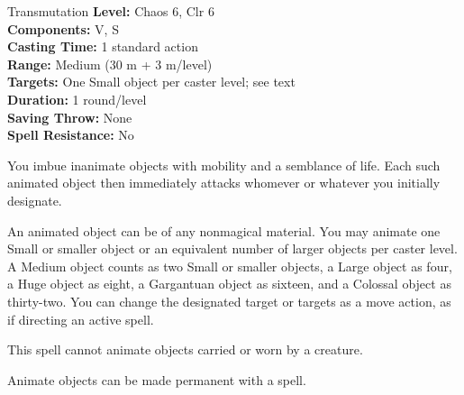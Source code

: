 {Transmutation}
{
	\textbf{Level:}
	Chaos 6, Clr 6\\
	\textbf{Components:}
	V, S\\
	\textbf{Casting Time:}
	1 standard action\\
	\textbf{Range:}
	Medium (30 m + 3 m/level)\\
	\textbf{Targets:}
	One Small object per caster level; see text\\
	\textbf{Duration:}
	1 round/level\\
	\textbf{Saving Throw:}
	None\\
	\textbf{Spell Resistance:}
	No\\
}
{
	You imbue inanimate objects with mobility and a semblance of life. Each such animated object then immediately attacks whomever or whatever you initially designate.

	An animated object can be of any nonmagical material. You may animate one Small or smaller object or an equivalent number of larger objects per caster level. A Medium object counts as two Small or smaller objects, a Large object as four, a Huge object as eight, a Gargantuan object as sixteen, and a Colossal object as thirty-two. You can change the designated target or targets as a move action, as if directing an active spell.

	This spell cannot animate objects carried or worn by a creature.

	Animate objects can be made permanent with a  spell.

}
